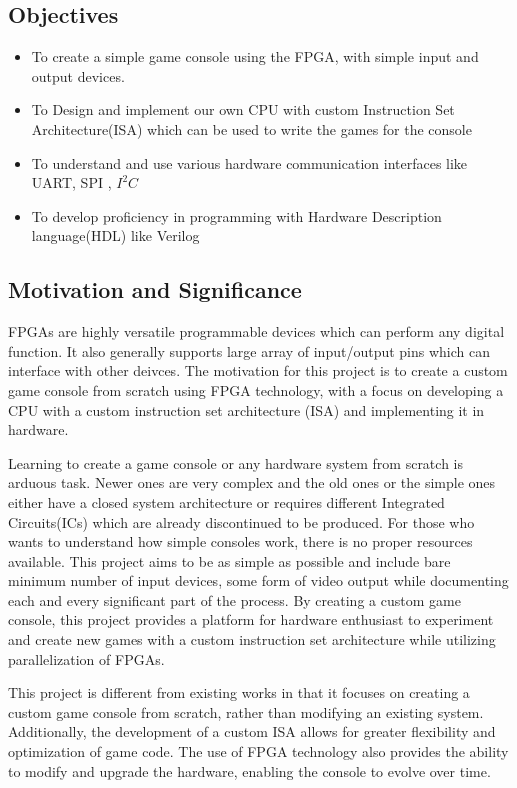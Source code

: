 \documentclass[a4paper,12pt]{article}
\begin{document}
    \subsection{Objectives}
    \begin{itemize}
        \item To create a simple game console using the FPGA, with simple input and output devices.
        \item To Design and implement our own CPU with custom Instruction Set Architecture(ISA) which can be used to write the games for the console
        \item To understand and use various hardware communication interfaces like UART, SPI , $I^2C$
        \item To develop proficiency in programming with Hardware Description language(HDL) like Verilog  
    \end{itemize}

    \subsection{Motivation and Significance}
    FPGAs are highly versatile programmable devices which can perform any digital function. It also generally supports large array of input/output pins which can interface with other deivces. The motivation for this project is to create a custom game console from scratch using FPGA technology, with a focus on developing a CPU with a custom instruction set architecture (ISA) and implementing it in hardware. 

    Learning to create a game console or any hardware system from scratch is arduous task. Newer ones are very complex and the old ones or the simple ones either have a closed system architecture or requires different Integrated Circuits(ICs) which are already discontinued to be produced. For those who wants to understand how simple consoles work, there is no proper resources available. This project aims to be as simple as possible and include bare minimum number of input devices, some form of video output while documenting each and every significant part of the process. By creating a custom game console, this project provides a platform for hardware enthusiast to experiment and create new games with a custom instruction set architecture while utilizing parallelization of FPGAs.

    This project is different from existing works in that it focuses on creating a custom game console from scratch, rather than modifying an existing system. Additionally, the development of a custom ISA allows for greater flexibility and optimization of game code. The use of FPGA technology also provides the ability to modify and upgrade the hardware, enabling the console to evolve over time.
\end{document}

